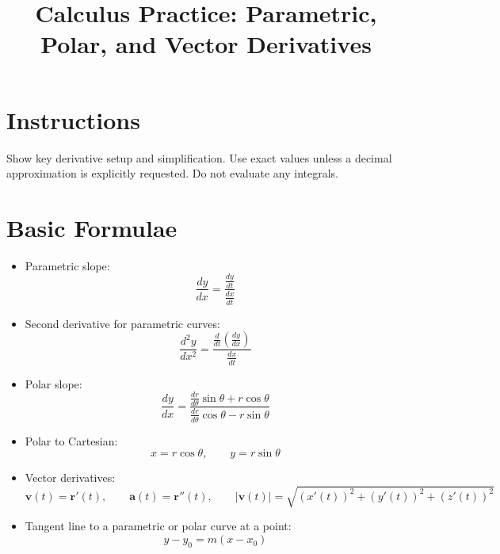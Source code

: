 \documentclass[12pt]{article}
\title{Calculus Practice: Parametric, Polar, and Vector Derivatives}
\author{}
\date{}
\begin{document}
\maketitle

\section*{Instructions}
Show key derivative setup and simplification. Use exact values unless a decimal approximation is explicitly requested. Do not evaluate any integrals.

\section*{Basic Formulae}
\begin{itemize}[leftmargin=1.5em]
  \item Parametric slope:
  \[
  \frac{dy}{dx}=\frac{\frac{dy}{dt}}{\frac{dx}{dt}}
  \]
  \item Second derivative for parametric curves:
  \[
  \frac{d^2y}{dx^2}=\frac{\frac{d}{dt}\left(\frac{dy}{dx}\right)}{\frac{dx}{dt}}
  \]
  \item Polar slope:
  \[
  \frac{dy}{dx}=\frac{\frac{dr}{d\theta}\sin\theta+r\cos\theta}{\frac{dr}{d\theta}\cos\theta-r\sin\theta}
  \]
  \item Polar to Cartesian:
  \[
  x=r\cos\theta,\qquad y=r\sin\theta
  \]
  \item Vector derivatives:
  \[
  \mathbf{v}(t)=\mathbf{r}'(t),\qquad \mathbf{a}(t)=\mathbf{r}''(t),\qquad
  |\mathbf{v}(t)|=\sqrt{(x'(t))^2+(y'(t))^2+(z'(t))^2}
  \]
  \item Tangent line to a parametric or polar curve at a point:
  \[
  y-y_0=m(x-x_0)
  \]
\end{itemize}
\end{document}

